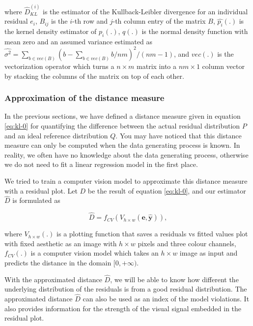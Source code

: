 \documentclass[]{interact}
\theoremstyle{plain}%
\theoremstyle{definition}
\theoremstyle{remark}
\begin{document}
\noindent where \(\hat{D}_{KL}^{(i)}\) is the estimator of the
Kullback-Leibler divergence for an individual residual \(e_i\),
\(B_{ij}\) is the \(i\)-th row and \(j\)-th column entry of the matrix
\(B\), \(\hat{p_i}(.)\) is the kernel density estimator of \(p_i(.)\),
\(q(.)\) is the normal density function with mean zero and an assumed
variance estimated as
\(\widehat{\sigma^2} = \sum_{b \in vec(B)}(b - \sum_{b \in vec(B)} b/nm)^2/(nm - 1)\),
and \(vec(.)\) is the vectorization operator which turns a
\(n \times m\) matrix into a \(nm \times 1\) column vector by stacking
the columns of the matrix on top of each other.

\subsubsection{Approximation of the distance
measure}\label{approximation-of-the-distance-measure}

In the previous sections, we have defined a distance measure given in
equation \ref{eq:kl-0} for quantifying the difference between the actual
residual distribution \(P\) and an ideal reference distribution \(Q\).
You may have noticed that this distance measure can only be computed
when the data generating process is known. In reality, we often have no
knowledge about the data generating process, otherwise we do not need to
fit a linear regression model in the first place.

We tried to train a computer vision model to approximate this distance
measure with a residual plot. Let \(D\) be the result of equation
\ref{eq:kl-0}, and our estimator \(\hat{D}\) is formulated as

\begin{equation}
\label{eq:d-approx}
\hat{D} = f_{CV}(V_{h \times w}(\boldsymbol{e}, \hat{\boldsymbol{y}})),
\end{equation}

\noindent where \(V_{h \times w}(.)\) is a plotting function that saves
a residuals vs fitted values plot with fixed aesthetic as an image with
\(h \times w\) pixels and three colour channels, \(f_{CV}(.)\) is a
computer vision model which takes an \(h \times w\) image as input and
predicts the distance in the domain \([0, +\infty)\).

With the approximated distance \(\hat{D}\), we will be able to know how
different the underlying distribution of the residuals is from a good
residual distribution. The approximated distance \(\hat{D}\) can also be
used as an index of the model violations. It also provides information
for the strength of the visual signal embedded in the residual plot.
\end{document}
